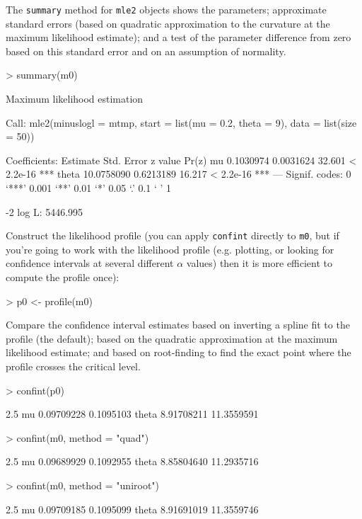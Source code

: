 \documentclass{article}
\newcommand{\code}[1]{{\tt #1}}
\begin{document}
The \code{summary} method for \code{mle2} objects
shows the parameters; approximate standard
errors (based on quadratic approximation to the curvature at
the maximum likelihood estimate); and a test
of the parameter difference from zero based on
this standard error and on an assumption of normality.

\begin{Schunk}
\begin{Sinput}
> summary(m0)
\end{Sinput}
\begin{Soutput}
Maximum likelihood estimation

Call:
mle2(minuslogl = mtmp, start = list(mu = 0.2, theta = 9), data = list(size = 50))

Coefficients:
        Estimate Std. Error z value     Pr(z)    
mu     0.1030974  0.0031624  32.601 < 2.2e-16 ***
theta 10.0758090  0.6213189  16.217 < 2.2e-16 ***
---
Signif. codes:  0 ‘***’ 0.001 ‘**’ 0.01 ‘*’ 0.05 ‘.’ 0.1 ‘ ’ 1 

-2 log L: 5446.995 
\end{Soutput}
\end{Schunk}

Construct the likelihood profile (you can
apply \code{confint} directly to \code{m0},
but if you're going to work with the likelihood
profile (e.g. plotting, or looking for confidence
intervals at several different $\alpha$ values)
then it is more efficient to compute the profile
once):

\begin{Schunk}
\begin{Sinput}
> p0 <- profile(m0)
\end{Sinput}
\end{Schunk}

Compare the confidence interval estimates based on
inverting a spline fit to the profile (the default);
based on the quadratic approximation at the
maximum likelihood estimate; and based on
root-finding to find the exact point where the
profile crosses the critical level.

\begin{Schunk}
\begin{Sinput}
> confint(p0)
\end{Sinput}
\begin{Soutput}
           2.5 %
mu    0.09709228  0.1095103
theta 8.91708211 11.3559591
\end{Soutput}
\begin{Sinput}
> confint(m0, method = "quad")
\end{Sinput}
\begin{Soutput}
           2.5 %
mu    0.09689929  0.1092955
theta 8.85804640 11.2935716
\end{Soutput}
\begin{Sinput}
> confint(m0, method = "uniroot")
\end{Sinput}
\begin{Soutput}
           2.5 %
mu    0.09709185  0.1095099
theta 8.91691019 11.3559746
\end{Soutput}
\end{Schunk}
\end{document}

